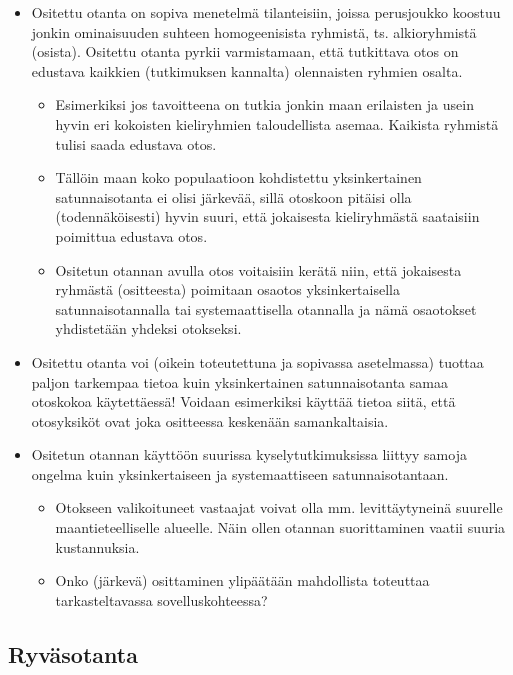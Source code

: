 \documentclass[
]{book}
\providecommand{\tightlist}{%
  \setlength{\itemsep}{0pt}\setlength{\parskip}{0pt}}
\begin{document}
\begin{itemize}
\tightlist
\item
  Ositettu otanta on sopiva menetelmä tilanteisiin, joissa perusjoukko koostuu jonkin ominaisuuden suhteen homogeenisista ryhmistä, ts. alkioryhmistä (osista). Ositettu otanta pyrkii varmistamaan, että tutkittava otos on edustava kaikkien (tutkimuksen kannalta) olennaisten ryhmien osalta.

  \begin{itemize}
  \tightlist
  \item
    Esimerkiksi jos tavoitteena on tutkia jonkin maan erilaisten ja usein hyvin eri kokoisten kieliryhmien taloudellista asemaa. Kaikista ryhmistä tulisi saada edustava otos.
  \item
    Tällöin maan koko populaatioon kohdistettu yksinkertainen satunnaisotanta ei olisi järkevää, sillä otoskoon pitäisi olla (todennäköisesti) hyvin suuri, että jokaisesta kieliryhmästä saataisiin poimittua edustava otos.
  \item
    Ositetun otannan avulla otos voitaisiin kerätä niin, että jokaisesta ryhmästä (ositteesta) poimitaan osaotos yksinkertaisella satunnaisotannalla tai systemaattisella otannalla ja nämä osaotokset yhdistetään yhdeksi otokseksi.
  \end{itemize}
\item
  Ositettu otanta voi (oikein toteutettuna ja sopivassa asetelmassa) tuottaa paljon tarkempaa tietoa kuin yksinkertainen satunnaisotanta samaa otoskokoa käytettäessä! Voidaan esimerkiksi käyttää tietoa siitä, että otosyksiköt ovat joka ositteessa keskenään samankaltaisia.
\item
  Ositetun otannan käyttöön suurissa kyselytutkimuksissa liittyy samoja ongelma kuin yksinkertaiseen ja systemaattiseen satunnaisotantaan.

  \begin{itemize}
  \tightlist
  \item
    Otokseen valikoituneet vastaajat voivat olla mm. levittäytyneinä suurelle maantieteelliselle alueelle. Näin ollen otannan suorittaminen vaatii suuria kustannuksia.
  \item
    Onko (järkevä) osittaminen ylipäätään mahdollista toteuttaa tarkasteltavassa sovelluskohteessa?
  \end{itemize}
\end{itemize}

\hypertarget{ryvuxe4sotanta}{%
\subsection{Ryväsotanta}\label{ryvuxe4sotanta}}
\end{document}
